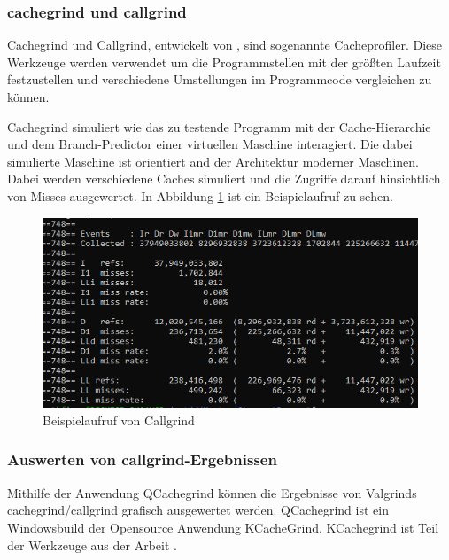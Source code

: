 \subsubsection{cachegrind und callgrind}

Cachegrind und Callgrind, entwickelt von \citeauthor{Weidendorfer2004ATS}, sind sogenannte Cacheprofiler. 
Diese Werkzeuge werden verwendet um die Programmstellen mit der größten Laufzeit festzustellen und verschiedene Umstellungen im Programmcode vergleichen zu können.

Cachegrind simuliert wie das zu testende Programm mit der Cache-Hierarchie und dem Branch-Predictor einer virtuellen Maschine interagiert. Die dabei simulierte Maschine ist orientiert and der Architektur moderner Maschinen.
Dabei werden verschiedene Caches simuliert und die Zugriffe darauf hinsichtlich von Misses ausgewertet. In Abbildung \ref{callgrind} ist ein Beispielaufruf zu sehen.
 

\begin{figure}
  \includegraphics{images/callgrind.png}
  \caption{Beispielaufruf von Callgrind}\label{callgrind}
\end{figure}


\subsubsection{Auswerten von callgrind-Ergebnissen}


Mithilfe der Anwendung QCachegrind können die Ergebnisse von Valgrinds cachegrind/callgrind grafisch ausgewertet werden. QCachegrind ist ein Windowsbuild der Opensource Anwendung KCacheGrind.
KCachegrind ist Teil der Werkzeuge aus der Arbeit \cite{Weidendorfer2004ATS}.

